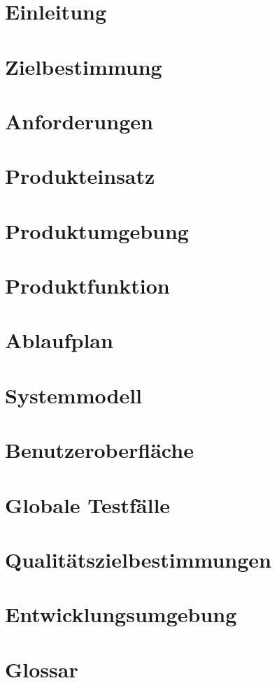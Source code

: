 

	\maketitle
	\setcounter{tocdepth}{1}
	\tableofcontents
	\chapter{Einleitung}
		
	\chapter{Zielbestimmung}
		
	\chapter{Anforderungen}
		
	\chapter{Produkteinsatz}
		
	\chapter{Produktumgebung}
		
	\chapter{Produktfunktion}
		
	\chapter{Ablaufplan}
		
	\chapter{Systemmodell}
		
	\chapter{Benutzeroberfläche}
		
	\chapter{Globale Testfälle}
		
	\chapter{Qualitätszielbestimmungen}
		
	\chapter{Entwicklungsumgebung}
		
	\chapter{Glossar}
		
